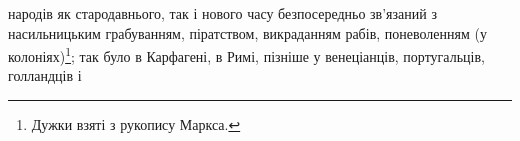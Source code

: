 народів як стародавнього, так і нового часу безпосередньо зв’язаний
з насильницьким грабуванням, піратством, викраданням рабів,
поневоленням (у колоніях)\footnote*{
Дужки взяті з рукопису Маркса. 
}; так було в Карфагені, в Римі,
пізніше у венеціанців, португальців, голландців і~
